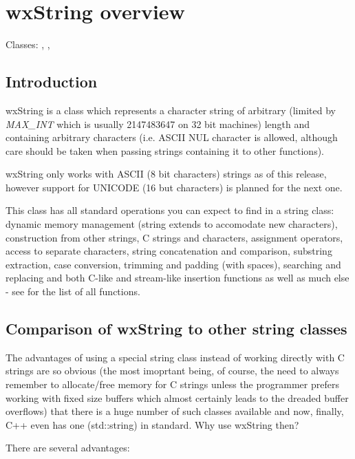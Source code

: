 \section{wxString overview}\label{wxstringoverview}

Classes: , , 

\subsection{Introduction}

wxString is a class which represents a character string of arbitrary (limited by 
{\it MAX\_INT} which is usually 2147483647 on 32 bit machines) length and containing
arbitrary characters (i.e. ASCII NUL character is allowed, although care should be
taken when passing strings containing it to other functions).

wxString only works with ASCII (8 bit characters) strings as of this release,
however support for UNICODE (16 but characters) is planned for the next one.

This class has all standard operations you can expect to find in a string class:
dynamic memory management (string extends to accomodate new characters),
construction from other strings, C strings and characters, assignment operators,
access to separate characters, string concatenation and comparison, substring
extraction, case conversion, trimming and padding (with spaces), searching and
replacing and both C-like  and stream-like
insertion functions as well as much else - see  
for the list of all functions.

\subsection{Comparison of wxString to other string classes}

The advantages of using a special string class instead of working directly with
C strings are so obvious (the most imoprtant being, of course, the need to always
remember to allocate/free memory for C strings unless the programmer prefers
working with fixed size buffers which almost certainly leads to the dreaded
buffer overflows) that there is a huge number of such classes available and now,
finally, C++ even has one (std::string) in standard. Why use wxString then?

There are several advantages:

